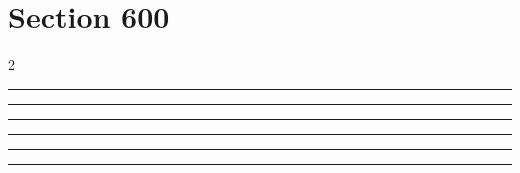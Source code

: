 \documentclass[11pt,a4paper]{article}
\begin{document}
\section{Section 600}
\begin{multicols}{2}
\begin{swarmwrap}%
  \begin{minipage}[t]{2cm}
    \centering
    \textcolor{blue!30}{\rule{\linewidth}{8cm}}
  \end{minipage}%
\end{swarmwrap}%
\swarmwrapnext\lipsum[1]\lipsum[2]
\end{multicols}
\begin{swarmwrap}%
  \begin{minipage}[t]{3cm}
    \centering
    \textcolor{red!20}{\rule{\linewidth}{9cm}}
  \end{minipage}%
\end{swarmwrap}%
\swarmwrapnext\lipsum[1]\lipsum[2]
\begin{swarmwrap}%
  \begin{minipage}[t]{4cm}
    \centering
    \textcolor{red!20}{\rule{\linewidth}{10cm}}
  \end{minipage}%
\end{swarmwrap}%
\swarmwrapnext\lipsum[1]\lipsum[2]\lipsum[3]
\begin{swarmwrap}%
  \begin{minipage}[t]{5cm}
    \centering
    \textcolor{red!20}{\rule{\linewidth}{2cm}}
  \end{minipage}%
\end{swarmwrap}%
\swarmwrapnext\lipsum[1]\lipsum[2]\lipsum[3]\lipsum[4]
\begin{swarmwrap}%
  \begin{minipage}[t]{2cm}
    \centering
    \textcolor{red!20}{\rule{\linewidth}{3cm}}
  \end{minipage}%
\end{swarmwrap}%
\swarmwrapnext\lipsum[1]\lipsum[2]\lipsum[3]\lipsum[4]\lipsum[5]
\begin{swarmwrap}%
  \begin{minipage}[t]{3cm}
    \centering
    \textcolor{red!20}{\rule{\linewidth}{4cm}}
  \end{minipage}%
\end{swarmwrap}%
\end{document}

